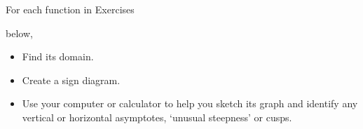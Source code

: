 {\noindent For each function in Exercises}
{below,
\begin{itemize}

\item Find its domain.
\item Create a sign diagram.
\item Use your computer or calculator to help you sketch its graph and identify any vertical or horizontal asymptotes, `unusual steepness' or cusps.

\end{itemize}}
